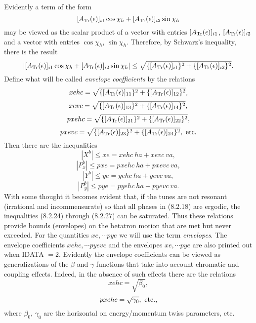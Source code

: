 Evidently a term of the form
\[
[A_{\rm Tr}(\epsilon)]_{i1} \cos \chi_h + [A_{\rm Tr}(\epsilon)]_{i2} \sin \chi_h
\]
may be viewed as the scalar product of a vector with entries $[A_{\rm Tr}(\epsilon)]_{i1}$, $[A_{\rm Tr}(\epsilon)]_{i2}$ and a vector with entries $\cos \chi_h$, $\sin \chi_h$.  Therefore, by Schwarz's inequality, there is the result
\begin{equation}
|[A_{\rm Tr} (\epsilon )]_{i1} \cos \chi_h + [A_{\rm Tr}(\epsilon )]_{i2} \sin \chi_h| \leq \sqrt{\{ [A_{\rm Tr} (\epsilon )]_{i1}\}^2 + \{ [A_{\rm Tr} (\epsilon )]_{i2}\}^2}.
\end{equation}
Define what will be called {\em envelope coefficients}  by the relations
\begin{equation}
xehc = \sqrt{\{ [A_{\rm Tr} (\epsilon )]_{11}\}^2 + \{ [A_{\rm Tr} (\epsilon )]_{12}\}^2},
\end{equation}
\begin{equation}
xevc = \sqrt{\{ [A_{\rm Tr} (\epsilon )]_{13}\}^2 + \{ [A_{\rm Tr} (\epsilon )]_{14}\}^2},
\end{equation}
\begin{equation}
pxehc = \sqrt{\{ [A_{\rm Tr} (\epsilon )]_{21}\}^2 + \{ [A_{\rm Tr} (\epsilon )]_{22}\}^2},
\end{equation}
\begin{equation}
pxevc = \sqrt{\{ [A_{\rm Tr} (\epsilon )]_{23}\}^2 + \{ [A_{\rm Tr} (\epsilon )]_{24}\}^2}, \ {\rm etc.}
\end{equation}
Then there are the inequalities
\begin{equation}
|X^b| \leq xe = xehc \ ha + xevc \ va ,
\end{equation}
\begin{equation}
|P_x^b| \leq pxe = pxehc \ ha + pxevc \ va ,
\end{equation}
\begin{equation}
|Y^b| \leq ye = yehc \ ha + yevc \  va ,
\end{equation}
\begin{equation}
|P_y^b| \leq pye = pyehc \ ha + pyevc \ va .
\end{equation}
With some thought it becomes evident that, if the tunes are not resonant (irrational and incommensurate) so that all phases in (8.2.18) are ergodic, the inequalities (8.2.24) through (8.2.27) can be saturated.  Thus these relations provide bounds (envelopes) on the betatron motion that are met but never exceeded.  For the quantities $xe, \cdots pye$ we will use the term {\em envelopes}.  The envelope coefficients $xehc, \cdots pyevc$ and the envelopes $xe, \cdots pye$ are also printed out when IDATA $= 2$.  Evidently the envelope coefficients can be viewed as generalizations of the $\beta$ and $\gamma$ functions that take into account chromatic and coupling effects.  Indeed, in the absence of such effects there are the relations
\begin{equation}
xehc = \sqrt{\beta_0},
\end{equation}
\begin{equation}
pxehc = \sqrt{\gamma_0} , \ {\rm etc.},
\end{equation}
where $\beta_0$, $\gamma_0$ are the horizontal on energy/momentum twiss parameters, etc.

